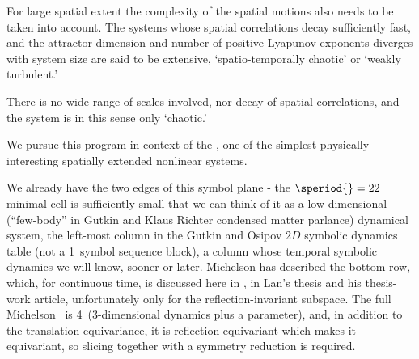 For large spatial extent the complexity of the spatial
motions also needs to be taken into account. The systems
whose spatial correlations decay sufficiently fast, and the
attractor dimension and number of positive Lyapunov exponents
diverges with system size are said
to be extensive, `spatio-temporally chaotic' or `weakly
turbulent.'

There is no wide range of scales
involved, nor decay of spatial correlations, and the system
is in this sense only `chaotic.'

We pursue this program in context of the \KSe, %
one of the simplest physically interesting spatially extended
nonlinear systems.


We already have the two edges of this symbol plane - the $\speriod{}=22$ minimal
cell is sufficiently small that we can think of it as
a low-dimensional (``few-body'' in Gutkin and Klaus
Richter condensed matter parlance)
dynamical system, the left-most column in the Gutkin and
Osipov $2D$ symbolic dynamics {\spt} table (not a
1\dmn\ symbol sequence block), a column whose temporal symbolic dynamics
we will know, sooner or later. Michelson has described the
bottom row, which, for continuous time, is discussed here in
, in Lan's thesis and his thesis-work
article, unfortunately only for the reflection-invariant
subspace. The full Michelson \statesp\ is 4\dmn\ (3-dimensional dynamics
plus a parameter), and, in addition to the translation equivariance, it
is reflection equivariant which makes it 
equivariant, so slicing together with a  symmetry reduction is
required.

